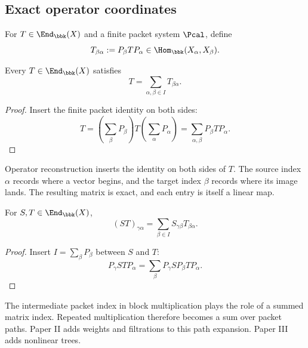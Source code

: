 \subsection{Exact operator coordinates}

\begin{definition}
\label{def:transfer-block}
For $T\in\End_{\bbk}(X)$ and a finite packet system $\Pcal$, define
\[
T_{\beta\alpha}:=P_\beta TP_\alpha
\in\Hom_{\bbk}(X_\alpha,X_\beta).
\]
\end{definition}

\begin{theorem}
\label{thm:operator-reconstruction}
Every $T\in\End_{\bbk}(X)$ satisfies
\[
\boxed{T=\sum_{\alpha,\beta\in I}T_{\beta\alpha}.}
\]
\end{theorem}

\begin{proof}
Insert the finite packet identity on both sides:
\[
T=
\left(\sum_\beta P_\beta\right)
T
\left(\sum_\alpha P_\alpha\right)
=
\sum_{\alpha,\beta}P_\beta TP_\alpha.
\]
\end{proof}

\begin{interpretation}
Operator reconstruction inserts the identity on both sides of \(T\).  The source index \(\alpha\) records where a vector begins, and the target index \(\beta\) records where its image lands.  The resulting matrix is exact, and each entry is itself a linear map.
\end{interpretation}


\begin{theorem}
\label{thm:block-multiplication}
For $S,T\in\End_{\bbk}(X)$,
\[
\boxed{
(ST)_{\gamma\alpha}
=
\sum_{\beta\in I}S_{\gamma\beta}T_{\beta\alpha}.
}
\]
\end{theorem}

\begin{proof}
Insert $I=\sum_\beta P_\beta$ between $S$ and $T$:
\[
P_\gamma STP_\alpha
=
\sum_\beta
P_\gamma SP_\beta TP_\alpha.
\]
\end{proof}

\begin{keyidea}
The intermediate packet index in block multiplication plays the role of a summed matrix index.  Repeated multiplication therefore becomes a sum over packet paths.  Paper II adds weights and filtrations to this path expansion.  Paper III adds nonlinear trees.
\end{keyidea}


